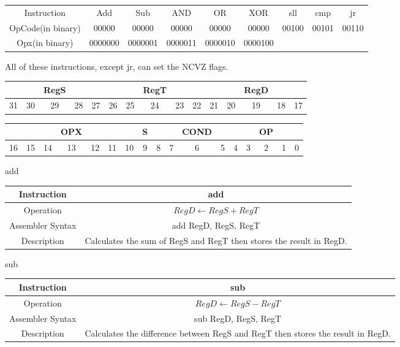 \documentclass[]{article}
\begin{document}
\begin{center}
	\begin{tabular}{|c|c|c|c|c|c|c|c|c|}\cline{1-9}
	Instruction & Add & Sub & AND & OR & XOR & sll & cmp & jr \\\cline{1-9}\hfill
	OpCode(in binary) & 00000 & 00000  & 00000 & 00000 & 00000 & 00100 & 00101 & 00110 \\\cline{1-9}\hfill
	Opx(in binary) & 0000000 & 0000001 & 0000011 & 0000010 & 0000100 &  &  & \\\cline{1-9}
	\end{tabular}
\end{center}
\noindent All of these instructions, except jr, can set the NCVZ flags.\\
\begin{tabular}{|ccccc|ccccc|ccccc|}\hline
  &  & RegS &  &  &  &  & RegT &  &  &  &  & RegD &  &\\\hline
31&30&29&28&27&26&25&24&23&22&21&20&19&18&17\\\hline
\end{tabular}

\begin{tabular}{|ccccccc|c|cccc|ccccc|}\hline
	&  & & OPX & &  & & S & & & COND & & & & OP & & \\\hline
16&15&14&13&12&11&10&9&8&7&6&5&4&3&2&1&0\\\hline
\end{tabular}
\vspace{5mm}

add\\
\begin{tabularx}{\textwidth}{c|c}\hline
	Instruction & add\\\hline
	Operation & $RegD \leftarrow RegS + RegT$\\\hline
	Assembler Syntax & add RegD, RegS, RegT\\\hline
	Description & Calculates the sum of RegS and RegT then stores the result in RegD.\\\hline
\end{tabularx}
\vspace{1.5cm}

sub\\
\begin{tabularx}{\textwidth}{c|c}\hline
	Instruction & sub\\\hline
	Operation & $RegD \leftarrow RegS - RegT$\\\hline
	Assembler Syntax & sub RegD, RegS, RegT\\\hline
	Description & Calculates the difference between RegS and RegT then stores the result in RegD.\\\hline
\end{tabularx}
\vspace{1.5cm}
\end{document}
